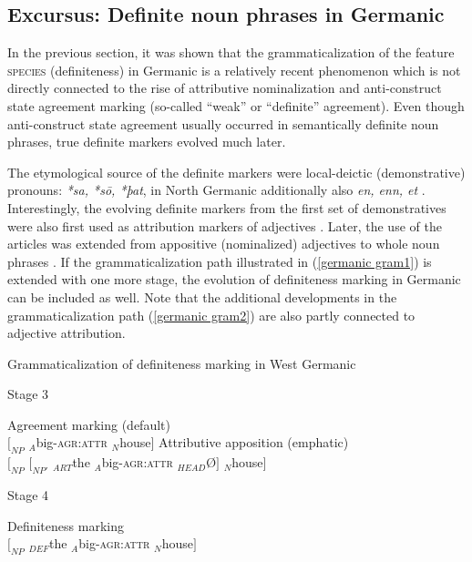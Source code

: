 {
\subsection[Definite noun phrases in Germanic]{Excursus: Definite noun phrases in Germanic}
In the previous section, it was shown that the grammaticalization of the feature \textsc{species} (definiteness) in Germanic is a relatively recent phenomenon which is not directly connected to the rise of attributive nominalization and anti-construct state agreement marking (so-called “weak” or “definite” agreement). Even though anti-construct state agreement usually occurred in semantically definite noun phrases, true definite markers evolved much later.

The etymological source of the definite markers were local-deictic (demonstrative) pronouns:  \textit{*sa, *sō, *þat}, in North Germanic additionally also \textit{en, enn, et} \citep[15]{heinrichs1954}. Interestingly, the evolving definite markers from the first set of  demonstratives were also first used as attribution markers of adjectives \citep{gamillscheg1937, nocentini1996}. Later, the use of the articles was extended from appositive (nominalized) adjectives to whole noun phrases \citep[63]{philippi1997}. If the grammaticalization path illustrated in (\ref{germanic gram1}) is extended with one more stage, the evolution of definiteness marking in Germanic can be included as well. Note that the additional developments in the grammaticalization path (\ref{germanic gram2}) are also partly connected to adjective attribution.
\begin{exe}
\label{germanic gram2}
\ex \rm{Grammaticalization of definiteness marking in West Germanic}
\begin{xlist}
\ex \rm{Stage 3}
\begin{xlist}
\ex \rm{Agreement marking (default)}\\
$[_{NP}$ $_{A}$big-\textsc{agr:attr} $_{N}$house$]$
\ex \rm{Attributive apposition (emphatic)}\\
$[_{NP}$ $[_{NP'}$ $_{ART}$the $_{A}$big-\textsc{agr:attr} $_{HEAD}$Ø$]$ $_{N}$house$]$\label{germanic art2}
\end{xlist}
\ex \rm{Stage 4}
\begin{xlist}
\ex \rm{Definiteness marking}\\
$[_{NP}$ $_{DEF}$the $_{A}$big-\textsc{agr:attr} $_{N}$house$]$\label{germanic def}
\end{xlist}

\end{xlist}
\end{exe}}
